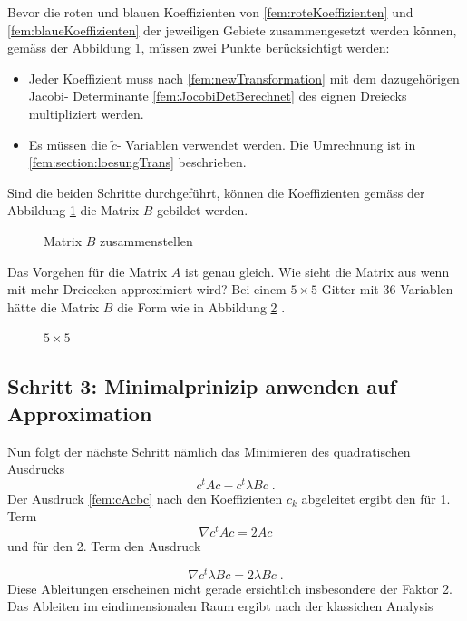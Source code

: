 Bevor die roten und blauen Koeffizienten von \eqref{fem:roteKoeffizienten} und \eqref{fem:blaueKoeffizienten} der jeweiligen Gebiete zusammengesetzt werden können, gemäss der Abbildung \ref{fem:MatrixBKomplett}, müssen zwei Punkte berücksichtigt werden:
\begin{itemize}
	\item Jeder Koeffizient muss nach \eqref{fem:newTransformation} mit dem dazugehörigen Jacobi- Determinante \eqref{fem:JocobiDetBerechnet} des eignen Dreiecks multipliziert werden. 
	\item Es müssen die $\tilde{c}$- Variablen verwendet werden. Die Umrechnung ist in  \ref{fem:section:loesungTrans} beschrieben.
\end{itemize}
Sind die beiden Schritte durchgeführt, können die Koeffizienten gemäss der Abbildung \ref{fem:MatrixBKomplett} die Matrix $B$ gebildet werden.
\begin{figure}[h]
	\centering
	
	\caption{Matrix $B$ zusammenstellen }
	\label{fem:MatrixBKomplett}
\end{figure}
Das Vorgehen für die Matrix $A$ ist genau gleich. 
Wie sieht die Matrix aus wenn mit mehr Dreiecken approximiert wird? Bei einem $5 \times 5$ Gitter mit 36 Variablen hätte die Matrix $B$ die Form wie in Abbildung \ref{fem:MatrixBGross} .

\begin{figure}[h]
	\centering
	
	\caption{$5 \times 5$}
	\label{fem:MatrixBGross}
\end{figure}


\subsection{Schritt 3: Minimalprinizip anwenden auf Approximation}

Nun folgt der nächste Schritt nämlich das Minimieren des quadratischen Ausdrucks
\begin{equation}
	c^t Ac - c^t \lambda Bc \; .
	\label{fem:cAcbc}
\end{equation}
Der Ausdruck \eqref{fem:cAcbc} nach den Koeffizienten $c_k$ abgeleitet ergibt den  für 1. Term
\begin{equation}
	\nabla c^t Ac = 2Ac
\end{equation}
und für den 2. Term den Ausdruck

\begin{equation}
	\nabla c^t \lambda Bc = 2\lambda Bc \; .
\end{equation}
Diese Ableitungen erscheinen nicht gerade ersichtlich insbesondere der Faktor 2.
Das Ableiten im  eindimensionalen Raum ergibt nach der klassichen Analysis

